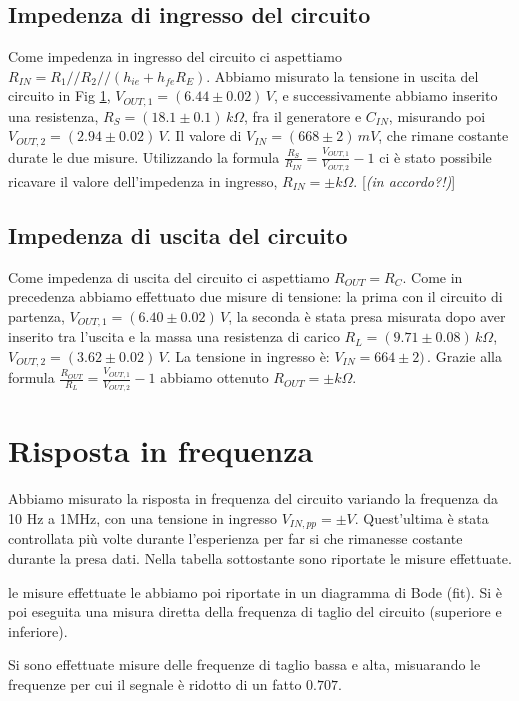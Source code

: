 \documentclass[10pt,a4paper]{article}
\newcommand{\rem}[1]{[\emph{#1}]}
\begin{document}
\subsection{Impedenza di ingresso del circuito}
Come impedenza in ingresso del circuito ci aspettiamo $R_{IN}=R_1//R_2//(h_{ie}+h_{fe}R_E)$.
Abbiamo misurato la tensione in uscita del circuito in Fig \ref{}, $V_{OUT,1} = (6.44\pm0.02) \, V$, e successivamente abbiamo inserito una resistenza, $R_S= (18.1\pm0.1) \, k\Omega$, fra il generatore e $C_{IN}$, misurando poi $V_{OUT,2}= (2.94 \pm 0.02) \, V$. Il valore di $V_{IN} = (668 \pm 2) \, mV$, che rimane costante durate le due misure. Utilizzando la formula $\frac{R_S}{R_{IN}}=\frac{V_{OUT,1}}{V_{OUT,2}}-1$ ci è stato possibile ricavare il valore dell'impedenza in ingresso, $R_{IN}= \pm k\Omega$. \rem{(in accordo?!)}

\subsection{Impedenza di uscita del circuito}
Come impedenza di uscita del circuito ci aspettiamo $R_{OUT}= R_C$. Come in precedenza abbiamo effettuato due misure di tensione: la prima con il circuito di partenza, $V_{OUT,1}= (6.40\pm0.02) \, V$, la seconda è stata presa misurata dopo aver inserito tra l'uscita e la massa una resistenza di carico $R_L = (9.71 \pm 0.08) \, k\Omega$, $V_{OUT,2}= (3.62\pm0.02)\,V$. La tensione in ingresso è: $V_{IN} = 664 \pm 2) \,$. Grazie alla formula $\frac{R_{OUT}}{R_{L}}=\frac{V_{OUT,1}}{V_{OUT,2}}-1$ abbiamo ottenuto $R_{OUT}= \pm k\Omega$.

\section{Risposta in frequenza}
Abbiamo misurato la risposta in frequenza del circuito variando la frequenza da 10 Hz a 1MHz, con una tensione in ingresso $V_{IN,pp}= \pm V$. Quest'ultima è stata controllata più volte durante l'esperienza per far si che rimanesse costante durante la presa dati. Nella tabella sottostante sono riportate le misure effettuate.


le misure effettuate le abbiamo poi riportate in un diagramma di Bode (fit).
Si è poi eseguita una misura diretta della frequenza di taglio del circuito (superiore e inferiore).

Si sono effettuate misure delle frequenze di taglio bassa e alta, misuarando le frequenze per cui il segnale è ridotto di un fatto $0.707$.
\end{document}
